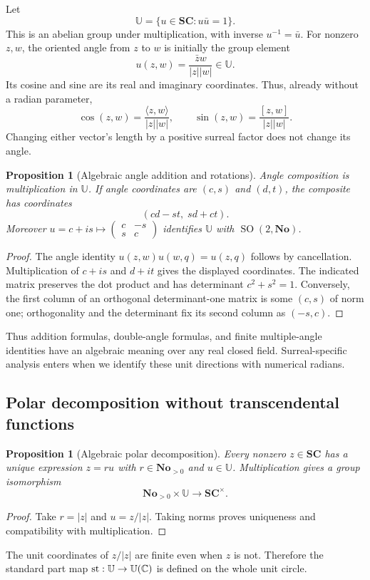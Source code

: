 \documentclass[11pt,letterpaper]{article}
\newtheorem{proposition}[theorem]{Proposition}
\theoremstyle{definition}
\theoremstyle{remark}
\newcommand{\No}{\mathbf{No}}
\newcommand{\SC}{\mathbf{SC}}
\newcommand{\U}{\mathbb U}\newcommand{\PP}{\mathbb P}
\newcommand{\st}{\operatorname{st}}
\newcommand{\SO}{\operatorname{SO}}
\numberwithin{equation}{section}
\begin{document}
Let
\[
 \U=\{u\in\SC:u\bar u=1\}.
\]
This is an abelian group under multiplication, with inverse $u^{-1}=\bar u$. For nonzero $z,w$, the oriented angle from $z$ to $w$ is initially the group element
\begin{equation}\label{eq:angleunit}
 u(z,w)=\frac{\bar zw}{|z||w|}\in\U.
\end{equation}
Its cosine and sine are its real and imaginary coordinates. Thus, already without a radian parameter,
\[
 \cos(z,w)=\frac{\langle z,w\rangle}{|z||w|},
 \qquad
 \sin(z,w)=\frac{[z,w]}{|z||w|}.
\]
Changing either vector's length by a positive surreal factor does not change its angle.

\begin{proposition}[Algebraic angle addition and rotations]\label{prop:rotation}
Angle composition is multiplication in $\U$. If angle coordinates are $(c,s)$ and $(d,t)$, the composite has coordinates
\[
 (cd-st,\;sd+ct).
\]
Moreover $u=c+is\mapsto\left(\begin{smallmatrix}c&-s\\s&c\end{smallmatrix}\right)$ identifies $\U$ with $\SO(2,\No)$.
\end{proposition}
\begin{proof}
The angle identity $u(z,w)u(w,q)=u(z,q)$ follows by cancellation. Multiplication of $c+is$ and $d+it$ gives the displayed coordinates. The indicated matrix preserves the dot product and has determinant $c^2+s^2=1$. Conversely, the first column of an orthogonal determinant-one matrix is some $(c,s)$ of norm one; orthogonality and the determinant fix its second column as $(-s,c)$.
\end{proof}
Thus addition formulas, double-angle formulas, and finite multiple-angle identities have an algebraic meaning over any real closed field. Surreal-specific analysis enters when we identify these unit directions with numerical radians.

\subsection{Polar decomposition without transcendental functions}
\begin{proposition}[Algebraic polar decomposition]\label{prop:polaralgebra}
Every nonzero $z\in\SC$ has a unique expression $z=ru$ with $r\in\No_{>0}$ and $u\in\U$. Multiplication gives a group isomorphism
\[
 \No_{>0}\times\U\longrightarrow\SC^\times.
\]
\end{proposition}
\begin{proof}
Take $r=|z|$ and $u=z/|z|$. Taking norms proves uniqueness and compatibility with multiplication.
\end{proof}
The unit coordinates of $z/|z|$ are finite even when $z$ is not. Therefore the standard part map $\st:\U\to\U(\C)$ is defined on the whole unit circle.
\end{document}
